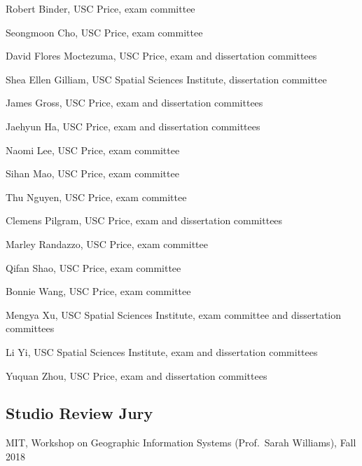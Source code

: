\documentclass[11pt,letterpaper]{report}
\newcommand{\listitemspace}{0.25em}
\renewenvironment{itemize}
{\begin{list}{}{\setlength{\leftmargin}{0em}
                \setlength{\parskip}{0em}
                \setlength{\itemsep}{\listitemspace}
                \setlength{\parsep}{\listitemspace}}}
{\end{list}}
\begin{document}
    \begin{itemize}

        \item Robert Binder, USC Price, exam committee
        \item Seongmoon Cho, USC Price, exam committee
        \item David Flores Moctezuma, USC Price, exam and dissertation committees
        \item Shea Ellen Gilliam, USC Spatial Sciences Institute, dissertation committee
        \item James Gross, USC Price, exam and dissertation committees
        \item Jaehyun Ha, USC Price, exam and dissertation committees
        \item Naomi Lee, USC Price, exam committee
        \item Sihan Mao, USC Price, exam committee
        \item Thu Nguyen, USC Price, exam committee
        \item Clemens Pilgram, USC Price, exam and dissertation committees
        \item Marley Randazzo, USC Price, exam committee
        \item Qifan Shao, USC Price, exam committee
        \item Bonnie Wang, USC Price, exam committee
        \item Mengya Xu, USC Spatial Sciences Institute, exam committee and dissertation committees
        \item Li Yi, USC Spatial Sciences Institute, exam and dissertation committees
        \item Yuquan Zhou, USC Price, exam and dissertation committees

    \end{itemize}

    \subsection*{Studio Review Jury}

    \begin{itemize}

    \item MIT, Workshop on Geographic Information Systems (Prof.\ Sarah Williams), Fall 2018

    \end{itemize}
\end{document}
